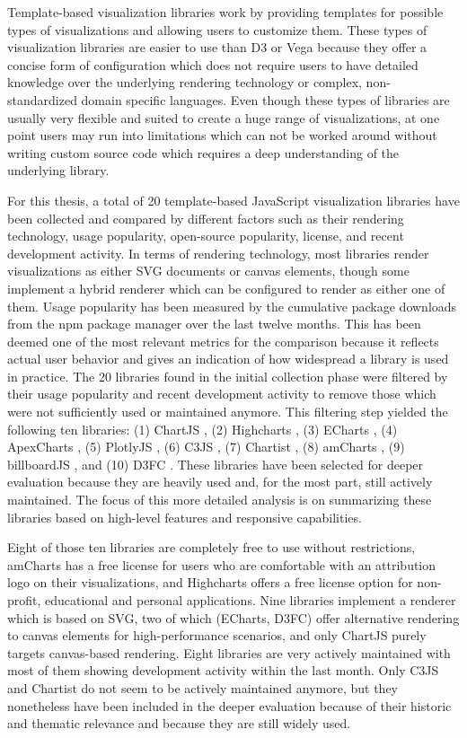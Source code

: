 Template-based visualization libraries work by providing templates for possible types of visualizations and allowing users to customize them. 
These types of visualization libraries are easier to use than D3 or Vega because they offer a concise form of configuration which does not require users to have detailed knowledge over the underlying rendering technology or complex, non-standardized domain specific languages. 
Even though these types of libraries are usually very flexible and suited to create a huge range of visualizations, at one point users may run into limitations which can not be worked around without writing custom source code which requires a deep understanding of the underlying library. 

For this thesis, a total of 20 template-based JavaScript visualization libraries have been collected and compared by different factors such as their rendering technology, usage popularity, open-source popularity, license, and recent development activity. 
In terms of rendering technology, most libraries render visualizations as either SVG documents or canvas elements, though some implement a hybrid renderer which can be configured to render as either one of them. 
Usage popularity has been measured by the cumulative package downloads from the npm package manager over the last twelve months. 
This has been deemed one of the most relevant metrics for the comparison because it reflects actual user behavior and gives an indication of how widespread a library is used in practice. 
The 20 libraries found in the initial collection phase were filtered by their usage popularity and recent development activity to remove those which were not sufficiently used or maintained anymore. 
This filtering step yielded the following ten libraries: (1) ChartJS \parencite{ChartJS}, (2) Highcharts \parencite{Highcharts}, (3) ECharts \parencite{ECharts}, (4) ApexCharts \parencite{ApexCharts}, (5) PlotlyJS \parencite{PlotlyJS}, (6) C3JS \parencite{C3JS}, (7) Chartist \parencite{Chartist}, (8) amCharts \parencite{amCharts}, (9) billboardJS \parencite{billboardJS}, and (10) D3FC \parencite{D3FC}. 
These libraries have been selected for deeper evaluation because they are heavily used and, for the most part, still actively maintained. 
The focus of this more detailed analysis is on summarizing these libraries based on high-level features and responsive capabilities.

Eight of those ten libraries are completely free to use without restrictions, amCharts has a free license for users who are comfortable with an attribution logo on their visualizations, and Highcharts offers a free license option for non-profit, educational and personal applications.
Nine libraries implement a renderer which is based on SVG, two of which (ECharts, D3FC) offer alternative rendering to canvas elements for high-performance scenarios, and only ChartJS purely targets canvas-based rendering. 
Eight libraries are very actively maintained with most of them showing development activity within the last month. 
Only C3JS and Chartist do not seem to be actively maintained anymore, but they nonetheless have been included in the deeper evaluation because of their historic and thematic relevance and because they are still widely used. 

